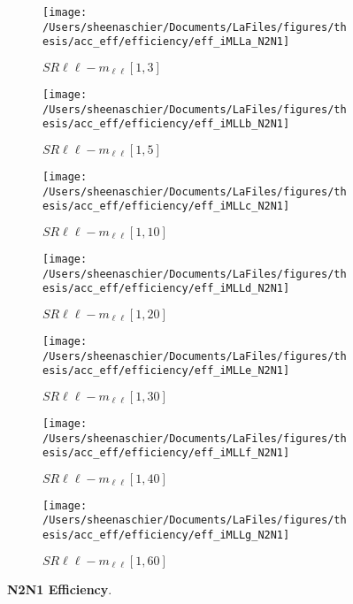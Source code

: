 \begin{figure}
        \centering
    \begin{subfigure}[b]{0.44\textwidth}
        \texttt{[image: /Users/sheenaschier/Documents/LaFiles/figures/thesis/acc\_eff/efficiency/eff\_iMLLa\_N2N1]}
    \caption{$SR\ell\ell-m_{\ell\ell} [1, 3]$}
    \end{subfigure}
    \begin{subfigure}[b]{0.44\textwidth}
        \texttt{[image: /Users/sheenaschier/Documents/LaFiles/figures/thesis/acc\_eff/efficiency/eff\_iMLLb\_N2N1]}
    \caption{$SR\ell\ell-m_{\ell\ell} [1, 5]$}
    \end{subfigure}
    \begin{subfigure}[b]{0.44\textwidth}
        \texttt{[image: /Users/sheenaschier/Documents/LaFiles/figures/thesis/acc\_eff/efficiency/eff\_iMLLc\_N2N1]}
    \caption{$SR\ell\ell-m_{\ell\ell} [1, 10]$}
    \end{subfigure}
    \begin{subfigure}[b]{0.44\textwidth}
        \texttt{[image: /Users/sheenaschier/Documents/LaFiles/figures/thesis/acc\_eff/efficiency/eff\_iMLLd\_N2N1]}
    \caption{$SR\ell\ell-m_{\ell\ell} [1, 20]$}
    \end{subfigure}
    \begin{subfigure}[b]{0.44\textwidth}
        \texttt{[image: /Users/sheenaschier/Documents/LaFiles/figures/thesis/acc\_eff/efficiency/eff\_iMLLe\_N2N1]}
    \caption{$SR\ell\ell-m_{\ell\ell} [1, 30]$}
    \end{subfigure}
    \begin{subfigure}[b]{0.44\textwidth}
        \texttt{[image: /Users/sheenaschier/Documents/LaFiles/figures/thesis/acc\_eff/efficiency/eff\_iMLLf\_N2N1]}
    \caption{$SR\ell\ell-m_{\ell\ell} [1, 40]$}
    \end{subfigure}
    \begin{subfigure}[b]{0.44\textwidth}
        \texttt{[image: /Users/sheenaschier/Documents/LaFiles/figures/thesis/acc\_eff/efficiency/eff\_iMLLg\_N2N1]}
    \caption{$SR\ell\ell-m_{\ell\ell} [1, 60]$}
    \end{subfigure}
    \caption{\textbf{N2N1 Efficiency}.}
\end{figure}

